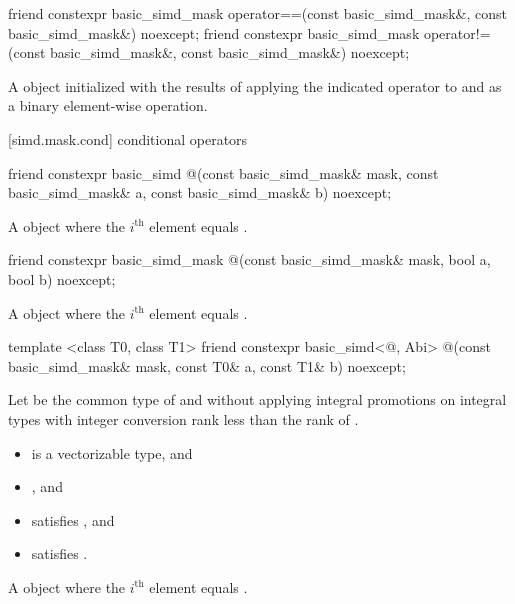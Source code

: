 \begin{itemdecl}
friend constexpr basic_simd_mask operator==(const basic_simd_mask&, const basic_simd_mask&) noexcept;
friend constexpr basic_simd_mask operator!=(const basic_simd_mask&, const basic_simd_mask&) noexcept;
\end{itemdecl}

\begin{itemdescr}
  \pnum\returns
  A  object initialized with the results of applying the indicated operator to  and  as a binary element-wise operation.
\end{itemdescr}

[simd.mask.cond]{ conditional operators}

\begin{itemdecl}
friend constexpr basic_simd @\simdselect@(const basic_simd_mask& mask, const basic_simd_mask& a, const basic_simd_mask& b) noexcept;
\end{itemdecl}

\begin{itemdescr}
  \pnum\returns
  A  object where the $i^\text{th}$ element equals  \foralli.
\end{itemdescr}

\begin{itemdecl}
friend constexpr basic_simd_mask @\simdselect@(const basic_simd_mask& mask, bool a, bool b) noexcept;
\end{itemdecl}

\begin{itemdescr}
  \pnum\returns
  A  object where the $i^\text{th}$ element equals  \foralli.
\end{itemdescr}

\begin{itemdecl}
template <class T0, class T1>
  friend constexpr basic_simd<@\seebelow@, Abi>
    @\simdselect@(const basic_simd_mask& mask, const T0& a, const T1& b) noexcept;
\end{itemdecl}

\begin{itemdescr}
  \pnum Let  be the common type of  and  without
  applying integral promotions on integral types with integer conversion rank
  less than the rank of .

  \pnum\constraints
  \begin{itemize}
    \item {} is a vectorizable type, and
    \item {}, and
    \item {} satisfies , and
    \item {} satisfies .
  \end{itemize}

  \pnum\returns
  A  object where the $i^\text{th}$ element equals  \foralli.
\end{itemdescr}

